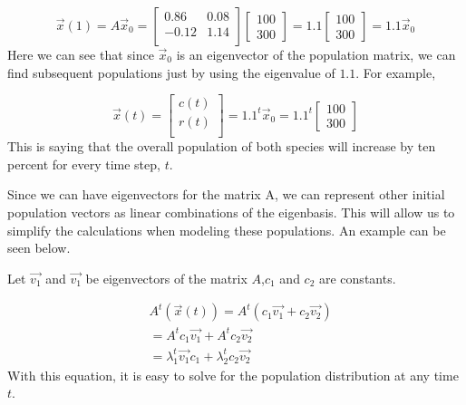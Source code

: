 \documentclass[12pt]{article}
\begin{document}
\begin{equation*}
    \Vec{x}(1)=A\Vec{x}_0
    =\begin{bmatrix}
    0.86  &   0.08\\
    -0.12  &    1.14\\
    \end{bmatrix}
    \begin{bmatrix}100\\300\end{bmatrix}
    =1.1\begin{bmatrix}100\\300\end{bmatrix}
    =1.1\vec{x}_0
\end{equation*}
Here we can see that since $\vec{x}_0$ is an eigenvector of the population matrix, we can find subsequent populations just by using the eigenvalue of $1.1$.  For example, 

\begin{equation*}
    \vec{x}(t)=
    \begin{bmatrix}
    c(t)\\
    r(t)  \\
    \end{bmatrix}
    =
    1.1^t\vec{x}_0
    =1.1^t\begin{bmatrix}100\\300\end{bmatrix}
    
\end{equation*}
 This is saying that the overall population of both species will increase by ten percent for every time step, $t$. 


Since we can have eigenvectors for the matrix A, we can represent other initial population vectors as linear combinations of the eigenbasis. This will allow us to simplify the calculations when modeling these populations. An example can be seen below.

Let $\vec{v_1}$ and $\vec{v_1}$ be eigenvectors of the matrix $A$,$c_1$ and $c_2$ are constants. 

\begin{align*}
     &A^{t}(\vec{x}(t))=A^t(c_1\vec{v_1}+c_2\vec{v_2})\\
     &=A^{t}c_1\vec{v_1}+A^{t}c_2\vec{v_2}\\
     &=\lambda_1^{t}\vec{v_1}c_1+\lambda_2^{t}c_2\vec{v_2}
\end{align*}
With this equation, it is easy to solve for the population distribution at any time $t$.
 

\end{document}
